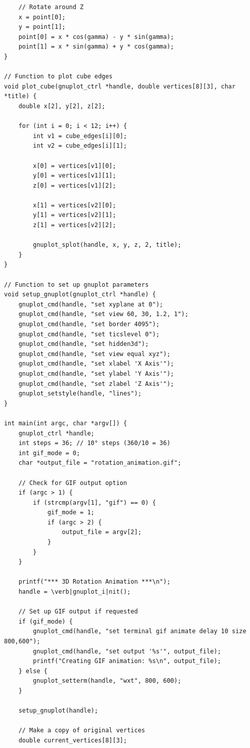 \documentclass[a4paper,10pt]{article}
\begin{document}
\begin{verbatim}
    // Rotate around Z
    x = point[0];
    y = point[1];
    point[0] = x * cos(gamma) - y * sin(gamma);
    point[1] = x * sin(gamma) + y * cos(gamma);
}

// Function to plot cube edges
void plot_cube(gnuplot_ctrl *handle, double vertices[8][3], char *title) {
    double x[2], y[2], z[2];

    for (int i = 0; i < 12; i++) {
        int v1 = cube_edges[i][0];
        int v2 = cube_edges[i][1];

        x[0] = vertices[v1][0];
        y[0] = vertices[v1][1];
        z[0] = vertices[v1][2];

        x[1] = vertices[v2][0];
        y[1] = vertices[v2][1];
        z[1] = vertices[v2][2];

        gnuplot_splot(handle, x, y, z, 2, title);
    }
}

// Function to set up gnuplot parameters
void setup_gnuplot(gnuplot_ctrl *handle) {
    gnuplot_cmd(handle, "set xyplane at 0");
    gnuplot_cmd(handle, "set view 60, 30, 1.2, 1");
    gnuplot_cmd(handle, "set border 4095");
    gnuplot_cmd(handle, "set ticslevel 0");
    gnuplot_cmd(handle, "set hidden3d");
    gnuplot_cmd(handle, "set view equal xyz");
    gnuplot_cmd(handle, "set xlabel 'X Axis'");
    gnuplot_cmd(handle, "set ylabel 'Y Axis'");
    gnuplot_cmd(handle, "set zlabel 'Z Axis'");
    gnuplot_setstyle(handle, "lines");
}

int main(int argc, char *argv[]) {
    gnuplot_ctrl *handle;
    int steps = 36; // 10° steps (360/10 = 36)
    int gif_mode = 0;
    char *output_file = "rotation_animation.gif";

    // Check for GIF output option
    if (argc > 1) {
        if (strcmp(argv[1], "gif") == 0) {
            gif_mode = 1;
            if (argc > 2) {
                output_file = argv[2];
            }
        }
    }

    printf("*** 3D Rotation Animation ***\n");
    handle = \verb|gnuplot_i|nit();

    // Set up GIF output if requested
    if (gif_mode) {
        gnuplot_cmd(handle, "set terminal gif animate delay 10 size 800,600");
        gnuplot_cmd(handle, "set output '%s'", output_file);
        printf("Creating GIF animation: %s\n", output_file);
    } else {
        gnuplot_setterm(handle, "wxt", 800, 600);
    }

    setup_gnuplot(handle);

    // Make a copy of original vertices
    double current_vertices[8][3];


\end{verbatim}
\end{document}
